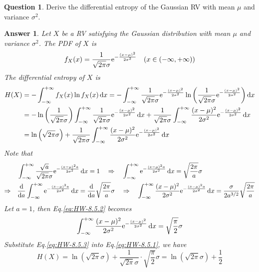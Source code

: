 \documentclass[utf8]{article}
\theoremstyle{definition}%
\newtheorem{question}{Question} %
\theoremstyle{plain}%
\newtheorem{answer}{Answer} %
\begin{document}
\begin{question}
    Derive the differential entropy of the Gaussian RV with mean $\mu$ and variance $\sigma^2$.
\end{question}
\begin{answer}
    Let $X$ be a RV satisfying the Gaussian distribution with mean $\mu$ and variance $\sigma^2$. The PDF of $X$ is
    \begin{equation}
        f_{X}(x) = \frac{1}{\sqrt{2\pi}\sigma} \mathrm{e}^{-\frac{(x - \mu)^2}{2\sigma^2}} \quad (x \in (-\infty, +\infty))
    \end{equation}
    The differential entropy of $X$ is
    \begin{equation}
    \begin{aligned}
        \label{eq:HW-8.5.1}
        H(X) &= -\int_{-\infty}^{+\infty} f_{X}(x) \ln f_{X}(x) \dd{x} = -\int_{-\infty}^{+\infty} \frac{1}{\sqrt{2\pi}\sigma} \mathrm{e}^{-\frac{(x - \mu)^2}{2\sigma^2}} \ln \left(\frac{1}{\sqrt{2\pi}\sigma} \mathrm{e}^{-\frac{(x - \mu)^2}{2\sigma^2}}\right) \dd{x} \\ 
        &= - \ln\left(\frac{1}{\sqrt{2\pi}\sigma}\right) \int_{-\infty}^{+\infty} \frac{1}{\sqrt{2\pi}\sigma} \mathrm{e}^{-\frac{(x - \mu)^2}{2\sigma^2}} \dd{x} + \frac{1}{\sqrt{2\pi}\sigma} \int_{-\infty}^{+\infty} \frac{(x - \mu)^2}{2\sigma^2} \mathrm{e}^{-\frac{(x - \mu)^2}{2\sigma^2}} \dd{x} \\
        &= \ln\left(\sqrt{2\pi}\sigma\right) + \frac{1}{\sqrt{2\pi}\sigma} \int_{-\infty}^{+\infty} \frac{(x - \mu)^2}{2\sigma^2} \mathrm{e}^{-\frac{(x - \mu)^2}{2\sigma^2}} \dd{x}
    \end{aligned}
    \end{equation}
    Note that 
    \begin{equation}
    \begin{aligned}
        \label{eq:HW-8.5.2}
        &\int_{-\infty}^{+\infty} \frac{\sqrt{a}}{\sqrt{2\pi}\sigma} \mathrm{e}^{-\frac{(x - \mu)^2 a}{2\sigma^2}} \dd{x} = 1 \quad\Rightarrow\quad \int_{-\infty}^{+\infty} \mathrm{e}^{-\frac{(x - \mu)^2 a}{2\sigma^2}} \dd{x} = \sqrt{\frac{2\pi}{a}}\sigma \\ 
        \Rightarrow\quad &\dv{a} \int_{-\infty}^{+\infty} \mathrm{e}^{-\frac{(x - \mu)^2 a}{2\sigma^2}} \dd{x} = \dv{a} \sqrt{\frac{2\pi}{a}}\sigma \quad\Rightarrow\quad \int_{-\infty}^{+\infty} \frac{(x - \mu)^2}{2\sigma^2} \mathrm{e}^{-\frac{(x - \mu)^2 a}{2\sigma^2}} \dd{x} = \frac{\sigma}{2a^{3/2}}\sqrt{\frac{2\pi}{a}} 
    \end{aligned}
    \end{equation}
    Let $a = 1$, then Eq.\ref{eq:HW-8.5.2} becomes
    \begin{equation}
        \label{eq:HW-8.5.3}
        \int_{-\infty}^{+\infty} \frac{(x - \mu)^2}{2\sigma^2} \mathrm{e}^{-\frac{(x - \mu)^2}{2\sigma^2}} \dd{x} = \sqrt{\frac{\pi}{2}}\sigma
    \end{equation}
    Substitute Eq.\ref{eq:HW-8.5.3} into Eq.\ref{eq:HW-8.5.1}, we have
    \begin{equation}
        H(X) = \ln\left(\sqrt{2\pi}\sigma\right) + \frac{1}{\sqrt{2\pi}\sigma} \cdot \sqrt{\frac{\pi}{2}}\sigma = \ln\left(\sqrt{2\pi}\sigma\right) + \frac{1}{2}
    \end{equation}
\end{answer}
\end{document}
